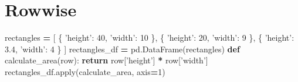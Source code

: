 \documentclass[]{book}
\newenvironment{Shaded}{\begin{snugshade}}{\end{snugshade}}
\newcommand{\BuiltInTok}[1]{#1}
\newcommand{\CommentTok}[1]{\textcolor[rgb]{0.56,0.35,0.01}{\textit{#1}}}
\newcommand{\ControlFlowTok}[1]{\textcolor[rgb]{0.13,0.29,0.53}{\textbf{#1}}}
\newcommand{\DecValTok}[1]{\textcolor[rgb]{0.00,0.00,0.81}{#1}}
\newcommand{\FloatTok}[1]{\textcolor[rgb]{0.00,0.00,0.81}{#1}}
\newcommand{\KeywordTok}[1]{\textcolor[rgb]{0.13,0.29,0.53}{\textbf{#1}}}
\newcommand{\NormalTok}[1]{#1}
\newcommand{\OperatorTok}[1]{\textcolor[rgb]{0.81,0.36,0.00}{\textbf{#1}}}
\newcommand{\StringTok}[1]{\textcolor[rgb]{0.31,0.60,0.02}{#1}}
\begin{document}
\begin{Shaded}
\end{Shaded}

\hypertarget{rowwise}{%
\section{Rowwise}\label{rowwise}}

\begin{Shaded}
\begin{Highlighting}[]
\NormalTok{rectangles }\OperatorTok{=}\NormalTok{ [}
\NormalTok{    \{ }\StringTok{'height'}\NormalTok{: }\DecValTok{40}\NormalTok{, }\StringTok{'width'}\NormalTok{: }\DecValTok{10}\NormalTok{ \},}
\NormalTok{    \{ }\StringTok{'height'}\NormalTok{: }\DecValTok{20}\NormalTok{, }\StringTok{'width'}\NormalTok{: }\DecValTok{9}\NormalTok{ \},}
\NormalTok{    \{ }\StringTok{'height'}\NormalTok{: }\FloatTok{3.4}\NormalTok{, }\StringTok{'width'}\NormalTok{: }\DecValTok{4}\NormalTok{ \}}
\NormalTok{]}
\NormalTok{rectangles_df }\OperatorTok{=}\NormalTok{ pd.DataFrame(rectangles)}
\KeywordTok{def}\NormalTok{ calculate_area(row):}
    \ControlFlowTok{return}\NormalTok{ row[}\StringTok{'height'}\NormalTok{] }\OperatorTok{*}\NormalTok{ row[}\StringTok{'width'}\NormalTok{]}
\NormalTok{rectangles_df.}\BuiltInTok{apply}\NormalTok{(calculate_area, axis}\OperatorTok{=}\DecValTok{1}\NormalTok{)}
\end{Highlighting}
\end{Shaded}
\end{document}
